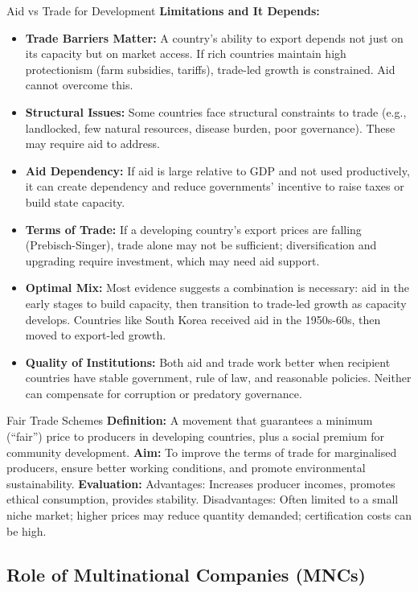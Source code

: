\documentclass[11pt, a4paper, twoside]{book}
\begin{document}
\begin{evaluation}{Aid vs Trade for Development}
\textbf{Limitations and It Depends:}
\begin{itemize}
  \item \textbf{Trade Barriers Matter:} A country's ability to export depends not just on its capacity but on market access. If rich countries maintain high protectionism (farm subsidies, tariffs), trade-led growth is constrained. Aid cannot overcome this.
  \item \textbf{Structural Issues:} Some countries face structural constraints to trade (e.g., landlocked, few natural resources, disease burden, poor governance). These may require aid to address.
  \item \textbf{Aid Dependency:} If aid is large relative to GDP and not used productively, it can create dependency and reduce governments' incentive to raise taxes or build state capacity.
  \item \textbf{Terms of Trade:} If a developing country's export prices are falling (Prebisch-Singer), trade alone may not be sufficient; diversification and upgrading require investment, which may need aid support.
  \item \textbf{Optimal Mix:} Most evidence suggests a combination is necessary: aid in the early stages to build capacity, then transition to trade-led growth as capacity develops. Countries like South Korea received aid in the 1950s-60s, then moved to export-led growth.
  \item \textbf{Quality of Institutions:} Both aid and trade work better when recipient countries have stable government, rule of law, and reasonable policies. Neither can compensate for corruption or predatory governance.
\end{itemize}
\end{evaluation}

\begin{keyterm}{Fair Trade Schemes}
\textbf{Definition:} A movement that guarantees a minimum (``fair'') price to producers in developing countries, plus a social premium for community development. \textbf{Aim:} To improve the terms of trade for marginalised producers, ensure better working conditions, and promote environmental sustainability. \textbf{Evaluation:} Advantages: Increases producer incomes, promotes ethical consumption, provides stability. Disadvantages: Often limited to a small niche market; higher prices may reduce quantity demanded; certification costs can be high.
\end{keyterm}

\subsection{Role of Multinational Companies (MNCs)}
\end{document}
